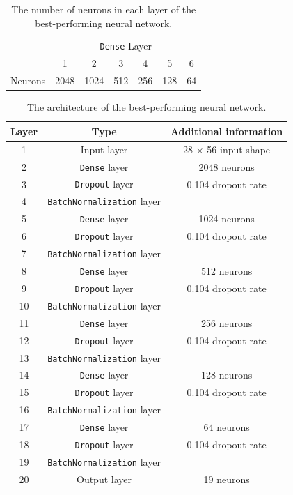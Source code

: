 \documentclass[11pt,a4paper]{article}
\begin{document}
\begin{table}[ht]
    \centering
    \begin{tabular}{c|c|c|c|c|c|c}
        &\multicolumn{6}{c}{\texttt{Dense} Layer} \\
        \cline{2-7}
         & 1 & 2 &3 &4 &5&6\\
        \hline
        Neurons & 2048 & 1024 & 512 & 256 & 128 & 64 \\
    \end{tabular}
    \caption{The number of neurons in each layer of the best-performing neural network.}\label{tab:neurons}
\end{table}

\begin{table}[ht]
    \centering
    \begin{tabular}{c|c|c}
        Layer & Type & Additional information\\
        \hline
        1 & Input layer & 28 $\times$ 56 input shape\\
        2 & \texttt{Dense} layer & 2048 neurons \\
        3 & \texttt{Dropout} layer & 0.104 dropout rate \\
        4 & \texttt{BatchNormalization} layer \\
        5 & \texttt{Dense} layer & 1024 neurons \\
        6 & \texttt{Dropout} layer & 0.104 dropout rate\\
        7 & \texttt{BatchNormalization} layer \\
        8 & \texttt{Dense} layer & 512 neurons \\
        9 & \texttt{Dropout} layer & 0.104 dropout rate\\
        10 & \texttt{BatchNormalization} layer \\
        11 & \texttt{Dense} layer & 256 neurons \\
        12 & \texttt{Dropout} layer & 0.104 dropout rate\\
        13 & \texttt{BatchNormalization} layer \\
        14 & \texttt{Dense} layer & 128 neurons \\
        15 & \texttt{Dropout} layer & 0.104 dropout rate\\
        16 & \texttt{BatchNormalization} layer \\
        17 & \texttt{Dense} layer & 64 neurons \\
        18 & \texttt{Dropout} layer & 0.104 dropout rate\\
        19 & \texttt{BatchNormalization} layer \\
        20 & Output layer & 19 neurons\\
    \end{tabular}
    \caption{The architecture of the best-performing neural network.}\label{tab:nn_arch}
\end{table}
\newpage
\end{document}

